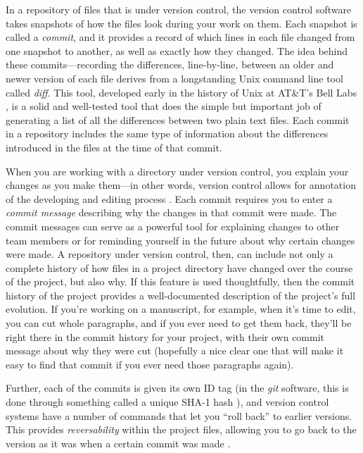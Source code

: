 \documentclass[]{tufte-book}
\begin{document}
In a repository of files that is under version control, the version control
software takes snapshots of how the files look during your work on them. Each
snapshot is called a \emph{commit}, and it provides a record of which lines in each
file changed from one snapshot to another, as well as exactly how they changed.
The idea behind these commits---recording the differences, line-by-line, between
an older and newer version of each file derives from a longstanding Unix command
line tool called \emph{diff}. This tool, developed early in the history of Unix at
AT\&T's Bell Labs \citep{raymond2003art}, is a solid and well-tested tool that does
the simple but important job of generating a list of all the differences between
two plain text files. Each commit in a repository includes the same type of
information about the differences introduced in the files at the time of that
commit.

When you are working with a directory under version control, you explain your
changes as you make them---in other words, version control allows for annotation
of the developing and editing process \citep{raymondunderstanding}. Each commit
requires you to enter a \emph{commit message} describing why the changes in that
commit were made. The commit messages can serve as a powerful tool for
explaining changes to other team members or for reminding yourself in the future
about why certain changes were made. A repository under version control, then,
can include not only a complete history of how files in a project directory have
changed over the course of the project, but also why. If this feature is used
thoughtfully, then the commit history of the project provides a well-documented
description of the project's full evolution. If you're working on a manuscript,
for example, when it's time to edit, you can cut whole paragraphs, and if you
ever need to get them back, they'll be right there in the commit history for
your project, with their own commit message about why they were cut (hopefully a
nice clear one that will make it easy to find that commit if you ever need those
paragraphs again).

Further, each of the commits is given its own ID tag (in the \emph{git} software,
this is done through something called a unique SHA-1 hash \citep{klemens201421st}),
and version control systems have a number of commands that let you ``roll back''
to earlier versions. This provides \emph{reversability} within the project files,
allowing you to go back to the version as it was when a certain commit was made
\citep{raymondunderstanding}.
\end{document}
